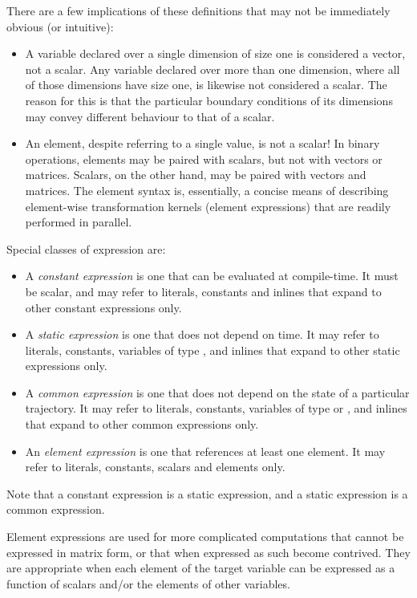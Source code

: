 There are a few implications of these definitions that may not be immediately
obvious (or intuitive):
\begin{itemize}
\item A variable declared over a single dimension of size one is considered a
  vector, not a scalar. Any variable declared over more than one dimension,
  where all of those dimensions have size one, is likewise not considered a
  scalar. The reason for this is that the particular boundary conditions of
  its dimensions may convey different behaviour to that of a scalar.

\item An element, despite referring to a single value, is not a scalar! In
  binary operations, elements may be paired with scalars, but not with vectors
  or matrices. Scalars, on the other hand, may be paired with vectors and
  matrices. The element syntax is, essentially, a concise means of describing
  element-wise transformation kernels (element
  expressions) that are readily performed in
  parallel.

\end{itemize}

Special classes of expression are:
\begin{itemize}
\item A \textit{constant expression} is one that
  can be evaluated at compile-time. It must be scalar, and may refer to
  literals, constants and inlines that expand to other constant expressions
  only.
\item A \textit{static expression} is one that does
  not depend on time. It may refer to literals, constants, variables of type
  , and inlines that expand to other static expressions only.
\item A \textit{common expression} is one that does
  not depend on the state of a particular trajectory. It may refer to
  literals, constants, variables of type  or , and
  inlines that expand to other common expressions only.
\item An \textit{element expression} is one that
  references at least one element. It may refer to literals, constants,
  scalars and elements only.
\end{itemize}
Note that a constant expression is a static expression, and a static
expression is a common expression.

Element expressions are used for more complicated
computations that cannot be expressed in matrix form, or that
when expressed as such become contrived.  They are appropriate when each
element of the target variable can be expressed as a function of scalars
and/or the elements of other variables.

